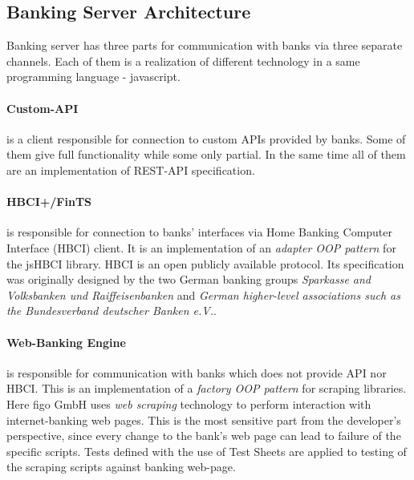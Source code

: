 \subsection{Banking Server Architecture}
\label{sec:bankingArch}
	Banking server has three parts for communication with banks via three separate channels. Each of them is a realization of different technology in a same programming language - javascript.  

	\paragraph{Custom-API} is a client responsible for connection to custom APIs provided by banks. Some of them give full functionality while some only partial. In the same time all of them are an implementation of REST-API specification.
	
	\paragraph{HBCI+/FinTS} is responsible for connection to banks' interfaces via Home Banking Computer Interface (HBCI) client. It is an implementation of an \textit{adapter OOP pattern} for the jsHBCI library.  HBCI is an open publicly available protocol. Its specification was originally designed by the two German banking groups \textit{Sparkasse and Volksbanken und Raiffeisenbanken} and \textit{German higher-level associations such as the Bundesverband deutscher Banken e.V.}\cite{finTS}.
	
	\paragraph{Web-Banking Engine} is responsible for communication with banks which does not provide API nor HBCI. This is an implementation of a \textit{factory OOP pattern} for scraping libraries. Here figo GmbH uses \textit{web scraping} technology to perform interaction with internet-banking web pages.
	This is the most sensitive part from the developer's perspective, since every change to the bank's web page can lead to failure of the specific scripts. Tests defined with the use of Test Sheets are applied to testing of the scraping scripts against banking web-page.
	
	
